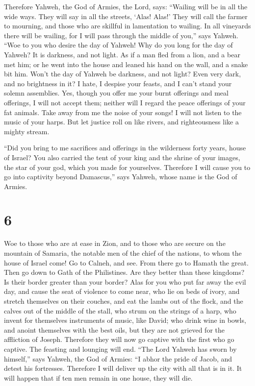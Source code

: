  Therefore Yahweh, the God of Armies, the Lord, says:
``Wailing will be in all the wide ways. They will say in all the
streets, `Alas! Alas!' They will call the farmer to mourning, and those
who are skillful in lamentation to wailing.  In all
vineyards there will be wailing, for I will pass through the middle of
you,'' says Yahweh.  ``Woe to you who desire the day of
Yahweh! Why do you long for the day of Yahweh? It is darkness, and not
light.  As if a man fled from a lion, and a bear met him;
or he went into the house and leaned his hand on the wall, and a snake
bit him.  Won't the day of Yahweh be darkness, and not
light? Even very dark, and no brightness in it?  I hate,
I despise your feasts, and I can't stand your solemn assemblies.
 Yes, though you offer me your burnt offerings and meal
offerings, I will not accept them; neither will I regard the peace
offerings of your fat animals.  Take away from me the
noise of your songs! I will not listen to the music of your harps.
 But let justice roll on like rivers, and righteousness
like a mighty stream.

 ``Did you bring to me sacrifices and offerings in the
wilderness forty years, house of Israel?  You also
carried the tent of your king and the shrine of your images, the star of
your god, which you made for yourselves.  Therefore I
will cause you to go into captivity beyond Damascus,'' says Yahweh,
whose name is the God of Armies.

\hypertarget{section-5}{%
\section{6}\label{section-5}}

 Woe to those who are at ease in Zion, and to those who
are secure on the mountain of Samaria, the notable men of the chief of
the nations, to whom the house of Israel come!  Go to
Calneh, and see. From there go to Hamath the great. Then go down to Gath
of the Philistines. Are they better than these kingdoms? Is their border
greater than your border?  Alas for you who put far away
the evil day, and cause the seat of violence to come near,
 who lie on beds of ivory, and stretch themselves on their
couches, and eat the lambs out of the flock, and the calves out of the
middle of the stall,  who strum on the strings of a harp,
who invent for themselves instruments of music, like David;
 who drink wine in bowls, and anoint themselves with the
best oils, but they are not grieved for the affliction of Joseph.
 Therefore they will now go captive with the first who go
captive. The feasting and lounging will end.  ``The Lord
Yahweh has sworn by himself,'' says Yahweh, the God of Armies: ``I abhor
the pride of Jacob, and detest his fortresses. Therefore I will deliver
up the city with all that is in it.  It will happen that
if ten men remain in one house, they will die.

